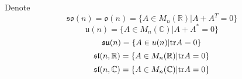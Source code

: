Denote  \[\mathfrak{so}(n)=\mathfrak{o}(n)=\{A\in M_n(\mathbb{R})|A+A^T=0\} \]
\[\mathfrak{u}(n)=\{A\in M_n(\mathbb{C})|A+A^*=0\}\]
\[\mathfrak{su}(n)=\{A\in u(n)|\mathrm{tr} A=0\}\]
\[\mathfrak{sl}(n,\mathbb{R})=\{A\in M_n(\mathbb{R})|\mathrm{tr} A=0\}\]
\[\mathfrak{sl}(n,\mathbb{C})=\{A\in M_n(\mathbb{C})|\mathrm{tr} A=0\}\]